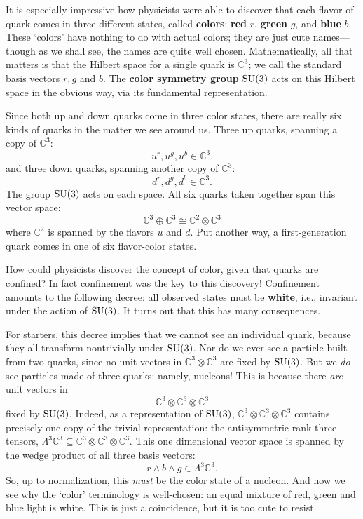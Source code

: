 \documentclass[12pt]{article}
\newcommand{\C}{{\mathbb C}}  %
\newcommand{\SU}{{\rm SU}}    %
\newcommand{\Ex}{\Lambda} %
\newcommand{\iso}{\cong} %
\begin{document}
It is especially impressive how physicists were able to discover
that each flavor of quark comes in three different states,
called \textbf{colors}: \textbf{red} $r$, \textbf{green} $g$, 
and \textbf{blue} $b$.  These `colors' have nothing to do with 
actual colors; they are just cute names---though as we shall see, 
the names are quite well chosen.  Mathematically, all that matters is
that the Hilbert space for a single quark is $\C^3$; we call the 
standard basis vectors $r, g$ and $b$.  The \textbf{color symmetry 
group} $\SU(3)$ acts on this Hilbert space in the obvious way, via 
its fundamental representation.

Since both up and down quarks come in three color states, there are 
really six kinds of quarks in the matter we see around us. 
Three up quarks, spanning a copy of $\C^3$:
\[ u^r, u^g, u^b \in \C^3 .\]
and three down quarks, spanning another copy of $\C^3$:
\[ d^r, d^g, d^b \in \C^3 .\]
The group $\SU(3)$ acts on each space.  
All six quarks taken together span this vector space:
\[ \C^3 \oplus \C^3 \iso \C^2 \otimes \C^3 \]
where $\C^2$ is spanned by the flavors $u$ and $d$.  Put another way,  a
first-generation quark comes in one of six flavor-color states.

How could physicists discover the concept of color, given that quarks
are confined?  In fact confinement was the key to this discovery!
Confinement amounts to the following decree: all observed
states must be {\bf white}, i.e., invariant under the action of
$\SU(3)$.  It turns out that this has many consequences.

For starters, this decree implies that we cannot see an individual
quark, because they all transform nontrivially under $\SU(3)$.  
Nor do we ever see a particle built from two quarks, since 
no unit vectors in $\C^3 \otimes \C^3$ are fixed by $\SU(3)$.  But 
we \emph{do} see particles made of three quarks: namely, nucleons!
This is because there \emph{are} unit vectors in 
\[ \C^3 \otimes \C^3 \otimes \C^3 \]
fixed by $\SU(3)$.  Indeed, as a representation of $\SU(3)$,
$\C^3 \otimes \C^3 \otimes \C^3$ contains precisely one copy of the trivial
representation: the antisymmetric rank three tensors, $\Ex^3 \C^3 \subseteq
\C^3 \otimes \C^3 \otimes \C^3$. This one dimensional vector space is spanned
by the wedge product of all three basis vectors:
\[ r \wedge b \wedge g \in \Ex^3 \C^3. \]
So, up to normalization, this \emph{must} be the color state of a nucleon. 
And now we see why the `color' terminology is well-chosen: an equal 
mixture of red, green and blue light is white.  This is just
a coincidence, but it is too cute to resist.
\end{document}
